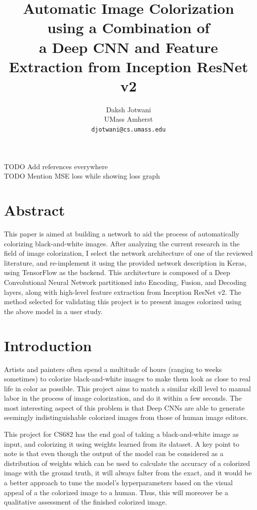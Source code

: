 \documentclass[10pt,twocolumn,letterpaper]{article}
\begin{document}
	\title{Automatic Image Colorization using a Combination of\\
	a Deep CNN and Feature Extraction from Inception ResNet v2}

	\author{Daksh Jotwani\\
	UMass Amherst\\
	{\tt\small djotwani@cs.umass.edu}
	}

	\maketitle

	TODO Add references everywhere\\
	TODO Mention MSE loss while showing loss graph

	\section{Abstract}
	This paper is aimed at building a network to aid the process of automatically colorizing black-and-white images. After analyzing the current research in the field of image colorization, I select the network architecture of one of the reviewed literature, and re-implement it using the provided network description in Keras, using TensorFlow as the backend. This architecture is composed of a Deep Convolutional Neural Network partitioned into Encoding, Fusion, and Decoding layers, along with high-level feature extraction from Inception ResNet v2. The method selected for validating this project is to present images colorized using the above model in a user study.

	\section{Introduction}
	Artists and painters often spend a multitude of hours (ranging to weeks sometimes) to colorize black-and-white images to make them look as close to real life in color as possible. This project aims to match a similar skill level to manual labor in the process of image colorization, and do it within a few seconds. The most interesting aspect of this problem is that Deep CNNs are able to generate seemingly indistinguishable colorized images from those of human image editors.

	This project for CS682 has the end goal of taking a black-and-white image as input, and colorizing it using weights learned from its dataset. A key point to note is that even though the output of the model can be considered as a distribution of weights which can be used to calculate the accuracy of a colorized image with the ground truth, it will always falter from the exact, and it would be a better approach to tune the model's hyperparameters based on the visual appeal of a the colorized image to a human. Thus, this will moreover be a qualitative assessment of the finished colorized image.
\end{document}
